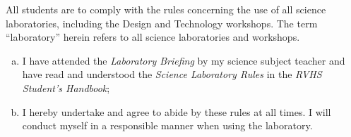 \documentclass[14pt,a4paper,oneside,openany,extrafontsizes,article]{memoir}
\begin{document}
\begin{center}
\end{center}

All students are to comply with the rules concerning the use of all science laboratories, including the Design and Technology workshops. The term ``laboratory'' herein refers to all science laboratories and workshops.

\begin{enumerate}[(a)]
\item I have attended the \emph{Laboratory Briefing} by my science subject teacher and have read and understood the \emph{Science Laboratory Rules} in the \emph{RVHS Student's Handbook};
\item I hereby undertake and agree to abide by these rules at all times. I will conduct myself in a responsible manner when using the laboratory.
\end{enumerate}
\end{document}
